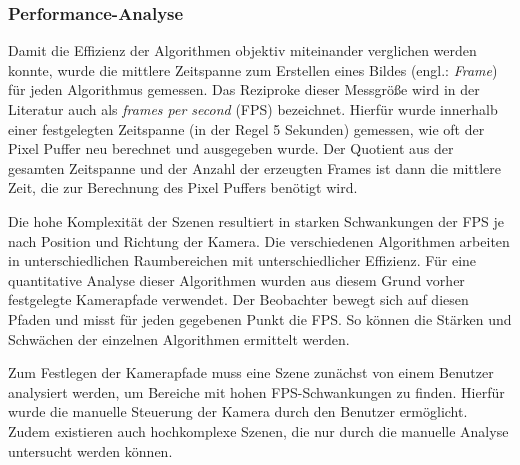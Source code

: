 \documentclass[crop=false]{standalone}
\begin{document}
      \subsubsection{Performance-Analyse} %
      \label{ssub:performance_analyse}
        Damit die Effizienz der Algorithmen objektiv miteinander verglichen werden konnte, wurde die mittlere Zeitspanne zum Erstellen eines Bildes (engl.: \textit{Frame}) für jeden Algorithmus gemessen.
        Das Reziproke dieser Messgröße wird in der Literatur auch als \textit{frames per second} (FPS) bezeichnet.
        Hierfür wurde innerhalb einer festgelegten Zeitspanne (in der Regel 5 Sekunden) gemessen, wie oft der Pixel Puffer neu berechnet und ausgegeben wurde.
        Der Quotient aus der gesamten Zeitspanne und der Anzahl der erzeugten Frames ist dann die mittlere Zeit, die zur Berechnung des Pixel Puffers benötigt wird.

        Die hohe Komplexität der Szenen resultiert in starken Schwankungen der FPS je nach Position und Richtung der Kamera.
        Die verschiedenen Algorithmen arbeiten in unterschiedlichen Raumbereichen mit unterschiedlicher Effizienz.
        Für eine quantitative Analyse dieser Algorithmen wurden aus diesem Grund vorher festgelegte Kamerapfade verwendet.
        Der Beobachter bewegt sich auf diesen Pfaden und misst für jeden gegebenen Punkt die FPS.
        So können die Stärken und Schwächen der einzelnen Algorithmen ermittelt werden.

        Zum Festlegen der Kamerapfade muss eine Szene zunächst von einem Benutzer analysiert werden, um Bereiche mit hohen FPS-Schwankungen zu finden.
        Hierfür wurde die manuelle Steuerung der Kamera durch den Benutzer ermöglicht.
        Zudem existieren auch hochkomplexe Szenen, die nur durch die manuelle Analyse untersucht werden können.
\end{document}
